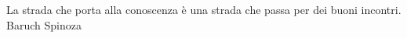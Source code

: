 \cleardoublepage
{}
\thispagestyle{empty}

\vspace*{3cm}

\begin{center}
    La strada che porta alla conoscenza è una strada che passa per dei buoni incontri. \\ \medskip
    Baruch Spinoza
\end{center}

\medskip

